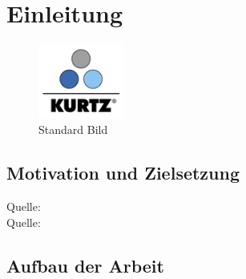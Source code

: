 \section{Einleitung}

	\begin{figure}[h!]
	\centering
		\includegraphics[width=0.25\textwidth]{Pics/Kurtz.png}
	\caption{Standard Bild}
	\label{fig:stani}
	\end{figure}

\subsection{Motivation und Zielsetzung}

Quelle: \cite{labview-buch01} \\
Quelle: \cite{internet}


\subsection{Aufbau der Arbeit}






